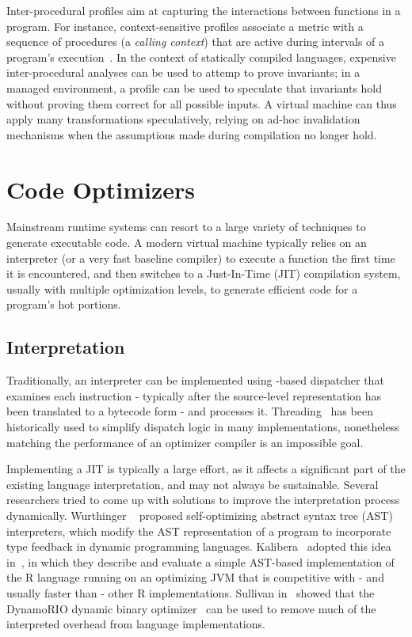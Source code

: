 Inter-procedural profiles aim at capturing the interactions between functions in a program. For instance, context-sensitive profiles associate a metric with a sequence of procedures (a {\em calling context}) that are active during intervals of a program's execution~\cite{Ammons97}. In the context of statically compiled languages, expensive inter-procedural analyses can be used to attemp to prove invariants; in a managed environment, a profile can be used to speculate that invariants hold without proving them correct for all possible inputs. A virtual machine can thus apply many transformations speculatively, relying on ad-hoc invalidation mechanisms when the assumptions made during compilation no longer hold.

\section{Code Optimizers}
Mainstream runtime systems can resort to a large variety of techniques to generate executable code. A modern virtual machine typically relies on an interpreter (or a very fast baseline compiler) to execute a function the first time it is encountered, and then switches to a Just-In-Time (JIT) compilation system, usually with multiple optimization levels, to generate efficient code for a program's hot portions.

\subsection*{Interpretation}
Traditionally, an interpreter can be implemented using -based dispatcher that examines each instruction - typically after the source-level representation has been translated to a bytecode form - and processes it. Threading~\cite{Bell73} has been historically used to simplify dispatch logic in many implementations, nonetheless matching the performance of an optimizer compiler is an impossible goal.

Implementing a JIT is typically a large effort, as it affects a significant part of the existing language interpretation, and may not always be sustainable. Several researchers tried to come up with solutions to improve the interpretation process dynamically. Wurthinger \etal~\cite{Wurthinger12} proposed self-optimizing abstract syntax tree (AST) interpreters, which modify the AST representation of a program to incorporate type feedback in dynamic programming languages. Kalibera \etal\ adopted this idea in~\cite{Kalibera14}, in which they describe and evaluate a simple AST-based implementation of the R language running on an optimizing JVM that is competitive with - and usually faster than - other R implementations. Sullivan \etal in~\cite{Sullivan03} showed that the DynamoRIO dynamic binary optimizer~\cite{Bala00} can be used to remove much of the interpreted overhead from language implementations.

